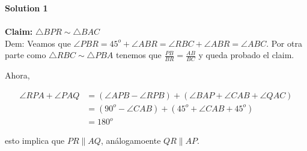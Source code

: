 \noindent\textbf{Solution 1}\\\\

\textbf{Claim:} $\triangle BPR\sim\triangle BAC$\\
Dem: Veamos que $\angle PBR = 45^{o} + \angle ABR = \angle RBC + \angle ABR = \angle ABC$.
Por otra parte como  $\triangle RBC\sim\triangle PBA$ tenemos que $\frac{PB}{BR}=\frac{AB}{BC}$ y queda probado el claim.

Ahora, 

\begin{equation*}
\begin{split}
\angle RPA +\angle PAQ & = (\angle APB-\angle RPB) + (\angle BAP +\angle CAB + \angle QAC) \\
& = (90^{o}-\angle CAB) + (45^{o}+\angle CAB+ 45^{o}) \\
& = 180^{o}
\end{split}   
\end{equation*}

esto implica que $PR\parallel AQ$, análogamoente $QR\parallel AP$.